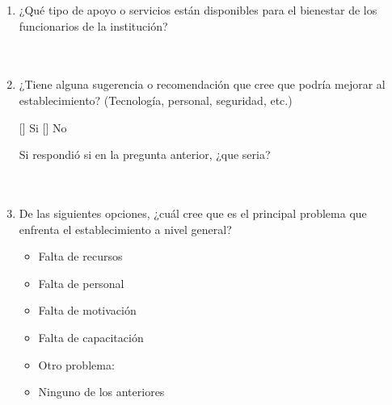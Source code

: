 \documentclass{article}
\begin{document}
\begin{enumerate}[leftmargin=*, label=\arabic*.]
    \item ¿Qué tipo de apoyo o servicios están disponibles para el bienestar de los funcionarios de la institución? \\[0.5cm]
        \underline{\hspace{0.95\linewidth}} \vspace{0.3cm} \\
        \underline{\hspace{0.95\linewidth}} \vspace{0.3cm} \\
        \underline{\hspace{0.95\linewidth}} \vspace{0.3cm}

    \item ¿Tiene alguna sugerencia o recomendación que cree que podría mejorar al establecimiento? (Tecnología, personal, seguridad, etc.)
    \begin{center}
        [\hspace*{0.25cm}] Si \hspace{1cm} [\hspace*{0.25cm}] No
    \end{center}
    Si respondió si en la pregunta anterior, ¿que seria? \\[0.5cm]
        \underline{\hspace{0.95\linewidth}} \vspace{0.3cm} \\
        \underline{\hspace{0.95\linewidth}} \vspace{0.3cm} \\
        \underline{\hspace{0.95\linewidth}} \vspace{0.3cm}
    \item De las siguientes opciones, ¿cuál cree que es el principal problema que enfrenta el establecimiento a nivel general?
        \begin{itemize}[label=$\square$]
            \item Falta de recursos
            \item Falta de personal
            \item Falta de motivación
            \item Falta de capacitación
            \item Otro problema: \underline{\hspace{0.5\linewidth}}
            \item Ninguno de los anteriores
        \end{itemize}
\end{enumerate}
\end{document}

